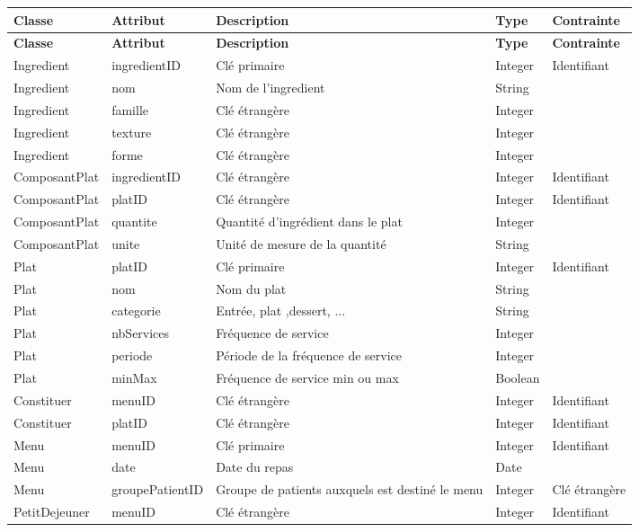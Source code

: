 \newpage
\begin{longtable}{llp{5cm}ll}
  \hline
  \textbf{Classe} & \textbf{Attribut} & \textbf{Description} & \textbf{Type} & \textbf{Contrainte} \\ \endfirsthead \hline
  \textbf{Classe} & \textbf{Attribut} & \textbf{Description} & \textbf{Type} & \textbf{Contrainte} \\ \endhead \hline
  Ingredient & ingredientID & Clé primaire & Integer & Identifiant \\
  Ingredient & nom & Nom de l'ingredient & String & \\
  Ingredient & famille & Clé étrangère & Integer & \\
  Ingredient & texture & Clé étrangère & Integer & \\
  Ingredient & forme & Clé étrangère & Integer & \\ \hline
  ComposantPlat & ingredientID & Clé étrangère & Integer & Identifiant \\
  ComposantPlat & platID & Clé étrangère & Integer & Identifiant \\
  ComposantPlat & quantite & Quantité d'ingrédient dans le plat & Integer & \\
  ComposantPlat & unite & Unité de mesure de la quantité & String & \\ \hline
  Plat & platID & Clé primaire & Integer & Identifiant \\
  Plat & nom & Nom du plat & String & \\
  Plat & categorie & Entrée, plat ,dessert, ... & String & \\
  Plat & nbServices & Fréquence de service & Integer & \\
  Plat & periode & Période de la fréquence de service & Integer & \\
  Plat & minMax & Fréquence de service min ou max & Boolean & \\ \hline
  Constituer & menuID & Clé étrangère & Integer & Identifiant \\
  Constituer & platID & Clé étrangère & Integer & Identifiant \\ \hline
  Menu & menuID & Clé primaire & Integer & Identifiant \\
  Menu & date & Date du repas & Date &  \\
  Menu & groupePatientID &  Groupe de patients auxquels est destiné le menu & Integer & Clé étrangère \\ \hline
  PetitDejeuner & menuID & Clé étrangère & Integer & Identifiant \\ \hline

\end{longtable}
